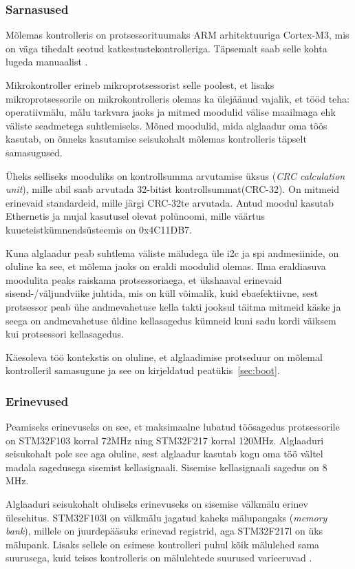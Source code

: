 \documentclass[12pt,a4paper]{article}
\begin{document}
\subsubsection{Sarnasused}
\label{sec:mcu:same}
Mõlemas kontrolleris on protsessorituumaks ARM arhitektuuriga Cortex-M3,
mis on väga tihedalt seotud katkestustekontrolleriga. Täpsemalt saab selle kohta
lugeda manuaalist \cite{CM3pm}.

Mikrokontroller erineb mikroprotsessorist selle poolest, et lisaks
mikroprotsessorile on mikrokontrolleris olemas ka ülejäänud vajalik, et tööd
teha: operatiivmälu, mälu tarkvara jaoks ja mitmed moodulid välise maailmaga ehk
väliste seadmetega suhtlemiseks. Mõned moodulid, mida alglaadur oma töös
kasutab, on õnneks kasutamise seisukohalt mõlemas kontrolleris täpselt
samasugused.

Üheks selliseks mooduliks on kontrollsumma arvutamise üksus (\textit{CRC
calculation unit}), mille abil saab arvutada 32-bitist kontrollsummat(CRC-32).
On mitmeid erinevaid standardeid, mille järgi CRC-32te arvutada. Antud moodul
kasutab Ethernetis ja mujal kasutusel olevat polünoomi, mille väärtus
kuueteistkümnendsüsteemis on 0x4C11DB7.

Kuna alglaadur peab suhtlema väliste mäludega üle \gls{i2c} ja \gls{spi}
andmesiinide, on oluline ka see, et mõlema jaoks on eraldi moodulid olemas. Ilma
eraldiasuva moodulita peaks raiskama protsessoriaega, et ükshaaval erinevaid
sisend-/väljundviike juhtida, mis on küll võimalik, kuid ebaefektiivne, sest
protsessor peab ühe andmevahetuse kella takti jooksul täitma mitmeid
käske ja seega on andmevahetuse üldine kellasagedus kümneid kuni sadu
kordi väiksem kui protsessori kellasagedus.

Käesoleva töö kontekstis on oluline, et alglaadimise protseduur on mõlemal
kontrolleril samasugune ja see on kirjeldatud peatükis~\ref{sec:boot}.

\subsubsection{Erinevused}
Peamiseks erinevuseks on see, et maksimaalne lubatud töösagedus protsessorile on
STM32F103 korral 72MHz ning STM32F217 korral 120MHz. Alglaaduri seisukohalt pole
see aga oluline, sest alglaadur kasutab kogu oma töö vältel madala sagedusega
sisemist kellasignaali. Sisemise kellasignaali sagedus on 8 MHz.

Alglaaduri seisukohalt oluliseks erinevuseks on sisemise välkmälu erinev
ülesehitus. STM32F103l on välkmälu jagatud kaheks mälupangaks (\textit{memory
bank}), millele on juurdepääsuks erinevad registrid, aga STM32F217l on üks
mälupank. Lisaks sellele on esimese kontrolleri puhul kõik mälulehed sama
suurusega, kuid teises kontrolleris on mälulehtede suurused varieeruvad
\cite{f1fpm,f2fpm}.
\end{document}
